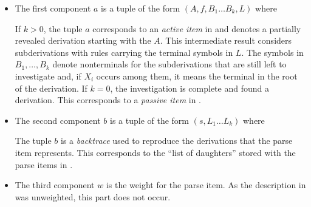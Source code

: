 \documentclass[../../document.tex]{subfiles}
\begin{document}
    \begin{itemize}
        \item The first component \(a\) is a tuple of the form \((A, f, B_1 \ldots B_k, L)\) where
            If \(k>0\), the tuple \(a\) corresponds to an \emph{active item} in  and denotes a partially revealed derivation starting with the  \(A\).
            This intermediate result considers subderivations with rules carrying the terminal symbols in \(L\).
            The symbols in \(B_1, \ldots, B_k\) denote nonterminals for the subderivations that are still left to investigate and, if \(X_i\) occurs among them, it means the terminal in the root of the derivation.
            If \(k=0\), the investigation is complete and found a derivation. This corresponds to a \emph{passive item} in .
        \item The second component \(b\) is a tuple of the form \((s, L_1 \ldots L_k)\) where
            The tuple \(b\) is a \emph{backtrace} used to reproduce the derivations that the parse item represents.
            This corresponds to the ``list of daughters'' stored with the parse items in .
        \item
            The third component \(w\) is the weight for the parse item.
            As the description in  was unweighted, this part does not occur.
    \end{itemize}
    
\end{document}
